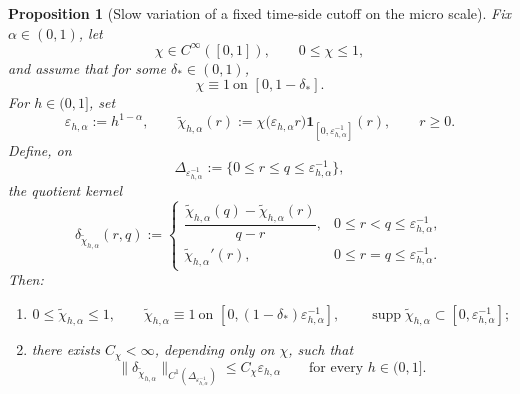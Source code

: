 \documentclass[11pt,a4paper]{amsart}
\theoremstyle{plain}
\newtheorem{proposition}[theorem]{Proposition}
\theoremstyle{definition}
\theoremstyle{remark}
\newcommand{\one}{\mathbf 1}
\begin{document}
\begin{proposition}[Slow variation of a fixed time-side cutoff on the micro scale]
\label{prop:micro-cutoff-scaling}
Fix \(\alpha\in(0,1)\), let
\[
\chi\in C^\infty([0,1]),
\qquad
0\le \chi\le 1,
\]
and assume that for some \(\delta_*\in(0,1)\),
\[
\chi\equiv 1\ \text{on }[0,1-\delta_*].
\]
For \(h\in(0,1]\), set
\[
\varepsilon_{h,\alpha}:=h^{1-\alpha},
\qquad
\widetilde\chi_{h,\alpha}(r)
:=
\chi\bigl(\varepsilon_{h,\alpha}r\bigr)\one_{[0,\varepsilon_{h,\alpha}^{-1}]}(r),
\qquad r\ge0.
\]
Define, on
\[
\Delta_{\varepsilon_{h,\alpha}^{-1}}
:=
\{0\le r\le q\le \varepsilon_{h,\alpha}^{-1}\},
\]
the quotient kernel
\[
\delta_{\widetilde\chi_{h,\alpha}}(r,q)
:=
\begin{cases}
\dfrac{\widetilde\chi_{h,\alpha}(q)-\widetilde\chi_{h,\alpha}(r)}{q-r},
& 0\le r<q\le \varepsilon_{h,\alpha}^{-1},\\[1ex]
\widetilde\chi_{h,\alpha}'(r), & 0\le r=q\le \varepsilon_{h,\alpha}^{-1}.
\end{cases}
\]
Then:
\begin{enumerate}[label=(\roman*)]
\item
\[
0\le \widetilde\chi_{h,\alpha}\le 1,
\qquad
\widetilde\chi_{h,\alpha}\equiv 1\ \text{on }
\left[0,(1-\delta_*)\varepsilon_{h,\alpha}^{-1}\right],
\qquad
\operatorname{supp}\widetilde\chi_{h,\alpha}\subset
[0,\varepsilon_{h,\alpha}^{-1}];
\]
\item there exists \(C_\chi<\infty\), depending only on \(\chi\), such that
\begin{equation}\label{eq:micro-cutoff-scaling}
\|\delta_{\widetilde\chi_{h,\alpha}}\|_{C^1(\Delta_{\varepsilon_{h,\alpha}^{-1}})}
\le
C_\chi \varepsilon_{h,\alpha}
\qquad\text{for every }h\in(0,1].
\end{equation}
\end{enumerate}
\end{proposition}
\end{document}
